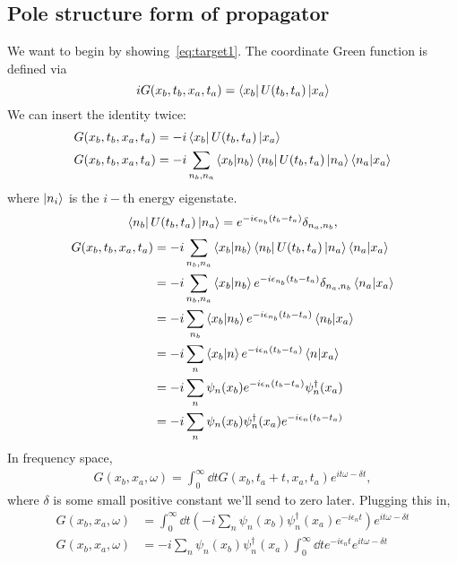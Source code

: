 \documentclass{article}
\begin{document}
	\subsection{Pole structure form of propagator} \label{subsec:sol1}
	We want to begin by showing~\eqref{eq:target1}.
	The coordinate Green function is defined via
	\begin{equation}
		i G(x_b, t_b, x_a, t_a) = \bra{x_b} U(t_b, t_a) \ket{x_a}
	\end{equation}
	We can insert the identity twice:
	\begin{align}
		G(x_b, t_b, x_a, t_a) &= -i \bra{x_b} U(t_b, t_a) \ket{x_a} \\
		G(x_b, t_b, x_a, t_a) &= -i \sum_{n_b, n_a} \bra{x_b} \ket{n_b}\bra{n_b} U(t_b, t_a) \ket{n_a}\bra{n_a}  \ket{x_a}
	\end{align}
	where $\ket{n_i}$ is the $i-$th energy eigenstate.
	\triv
	\begin{equation}
		\bra{n_b} U(t_b, t_a) \ket{n_a} = e^{-i \epsilon_{n_b} (t_b - t_a)} \delta_{n_a, n_b},
	\end{equation}
	\thrf
	\begin{align}
		G(x_b, t_b, x_a, t_a) &= -i \sum_{n_b, n_a} \bra{x_b} \ket{n_b}\bra{n_b} U(t_b, t_a) \ket{n_a}\bra{n_a}  \ket{x_a} \\
		&= -i \sum_{n_b, n_a} \bra{x_b} \ket{n_b}e^{-i \epsilon_{n_b} (t_b - t_a)} \delta_{n_a, n_b}\bra{n_a}  \ket{x_a} \\
		&= -i \sum_{n_b} \bra{x_b} \ket{n_b}e^{-i \epsilon_{n_b} (t_b - t_a)} \bra{n_b}  \ket{x_a} \\
		&= -i \sum_{n} \bra{x_b} \ket{n}e^{-i \epsilon_{n} (t_b - t_a)} \bra{n}  \ket{x_a} \\
		&= -i \sum_{n} \psi_n(x_b) e^{-i \epsilon_{n} (t_b - t_a)} \psi_n^\dagger(x_a) \\
		&= -i \sum_{n} \psi_n(x_b) \psi_n^\dagger(x_a)  e^{-i \epsilon_{n} (t_b - t_a)}
	\end{align}
	In frequency space,
	\begin{align}
		G(x_b, x_a, \omega) = \int_0^\infty \dd{t} G(x_b, t_a + t, x_a, t_a) e^{i t \omega - \delta t},
	\end{align}
	where $\delta$ is some small positive constant we'll send to zero later.
	Plugging this in,
	\begin{align}
		G(x_b, x_a, \omega) &= \int_0^\infty \dd{t} \left( -i \sum_{n} \psi_n(x_b) \psi_n^\dagger(x_a)  e^{-i \epsilon_{n} t} \right) e^{i t \omega - \delta t} \\
		G(x_b, x_a, \omega) &= -i \sum_{n} \psi_n(x_b) \psi_n^\dagger(x_a)  \int_0^\infty \dd{t} e^{-i \epsilon_{n} t} e^{i t \omega - \delta t}
	\end{align}
\end{document}
